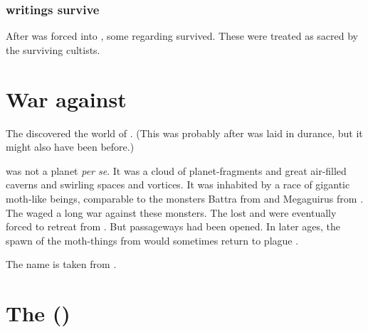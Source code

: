 \subsubsection{\Sethican writings survive}
After \Sethicus was forced into , some  regarding  survived. 
These were treated as sacred by the surviving \Sethican cultists. 















\section{War against \Shuggon}
\index{\Shuggon}
The \ophidians discovered the world of \Shuggon. 
(This was probably after \Sethicus was laid in durance, but it might also have been before.)

\Shuggon was not a planet \emph{per se}. 
It was a cloud of planet-fragments and great air-filled caverns and swirling spaces and vortices. 
It was inhabited by a race of gigantic moth-like beings, comparable to the monsters Battra from \cite{Movie:GodzillaVsMothra} and Megaguirus from \cite{Movie:GodzillaVsMegaguirus}. 
The \ophidians waged a long war against these monsters.
The \ophidians lost and were eventually forced to retreat from \Shuggon. 
But passageways had been opened. 
In later ages, the spawn of the moth-things from \Shuggon would sometimes return to plague \Miith. 

The name \quo{\Shuggon} is taken from \cite{HPLovecraft:TheBlackTomeofAlsophocus}. 














\section{The \FirstBanewar ()}









